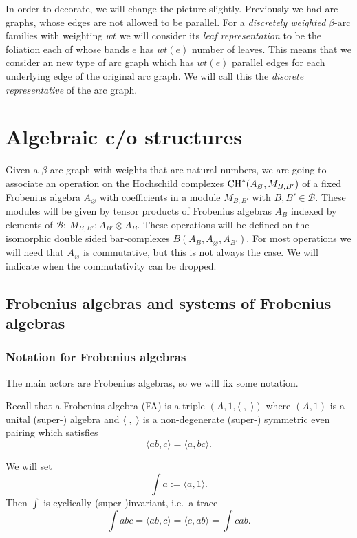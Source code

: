 \documentclass[pdftex]{sigma}
\def\calB{{\mathcal B}}
\def\la{\langle}
\def\ra{\rangle}
\begin{document}
In order to decorate, we will change the picture slightly. Previously we had arc graphs, whose
edges are not allowed to be parallel. For a {\em discretely weighted} $\beta$-arc families with weighting $wt$
we  will consider its {\em leaf representation} to be the foliation each of whose bands $e$ has
$wt(e)$ number of leaves. This means that we consider an new type of arc graph which has $wt(e)$ parallel
edges for each underlying edge of the original arc graph. We will call this the {\em discrete representative}
of the arc graph.


\section{Algebraic c/o structures}
\label{algsection}

Given a $\beta$-arc graph with weights that are natural numbers, we are going to
associate an operation on the Hochschild complexes  ${\rm CH}^*(A_{\varnothing},M_{B,B'})$
of a f\/ixed Frobenius algebra $A_{\varnothing}$ with coef\/f\/icients in a module $M_{B,B'}$ with $B,B'\in \calB$.
These modules will be given by tensor products of Frobenius algebras $A_B$ indexed by elements of $\calB$: $M_{B,B'}: A_{B'}\otimes A_B$. These operations will be def\/ined on the isomorphic
double sided bar-complexes  $B(A_B,A_{\varnothing},A_{B'})$. For most operations we will need
that $A_{\varnothing}$ is commutative, but this is not always the case.  We will indicate
when the commutativity can be dropped.


\subsection{Frobenius algebras and systems of Frobenius algebras}

\subsubsection{Notation for Frobenius algebras}
The main actors are  Frobenius algebras, so we will f\/ix some notation.

Recall that a Frobenius algebra (FA) is a triple $(A,1, \langle \; ,\;\rangle)$
where $(A,1)$ is a unital (super-) algebra and $\langle \; ,\;\rangle$ is a non-degenerate
(super-) symmetric even pairing which satisf\/ies
\begin{equation*}
\langle ab,c\rangle=\langle a,bc\rangle.
\end{equation*}

We will set
\begin{equation*}
\int a :=\langle a , 1 \rangle.
\end{equation*}
Then $\int$ is cyclically (super-)invariant, i.e.\ a trace
\begin{equation*}
\int abc = \la ab,c\ra =\la c, ab\ra=\int cab.
\end{equation*}
\end{document}
